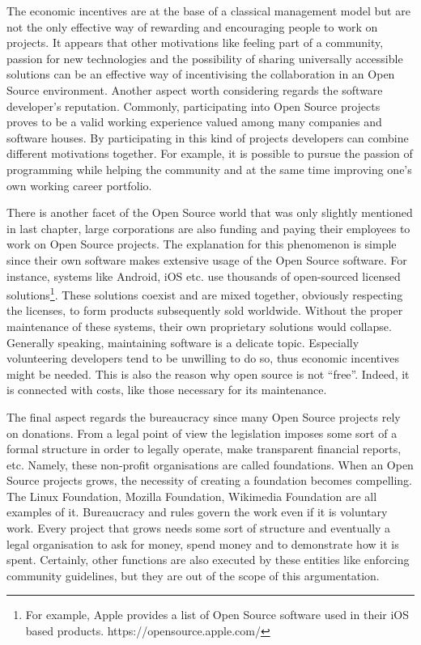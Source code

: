 The economic incentives are at the base of a classical management model but are not the only effective way of rewarding and encouraging people to work on projects. It appears that other motivations like feeling part of a community, passion for new technologies and the possibility of sharing universally accessible solutions can be an effective way of incentivising the collaboration in an Open Source environment.
Another aspect worth considering regards the software developer’s reputation. Commonly, participating into Open Source projects proves to be a valid working experience valued among many companies and software houses. By participating in this kind of projects developers can combine different motivations together. For example, it is possible to pursue the passion of programming while helping the community and at the same time improving one’s own working career portfolio.

There is another facet of the Open Source world that was only slightly mentioned in last chapter, large corporations are also funding and paying their employees to work on Open Source projects. The explanation for this phenomenon is simple since their own software makes extensive usage of the Open Source software. For instance, systems like Android, iOS etc. use thousands of open-sourced licensed solutions\footnote{For example, Apple provides a list of Open Source software used in their iOS based products. https://opensource.apple.com/}. These solutions coexist and are mixed together, obviously respecting the licenses, to form products subsequently sold worldwide.
Without the proper maintenance of these systems, their own proprietary solutions would collapse. Generally speaking, maintaining software is a delicate topic. Especially volunteering developers tend to be unwilling to do so, thus economic incentives might be needed. This is also the reason why open source is not “free”. Indeed, it is connected with costs, like those necessary for its maintenance.

The final aspect regards the bureaucracy since many Open Source projects rely on donations. From a legal point of view the legislation imposes some sort of a formal structure in order to legally operate, make transparent financial reports, etc. Namely, these non-profit organisations are called foundations. When an Open Source projects grows, the necessity of creating a foundation becomes compelling. The Linux Foundation, Mozilla Foundation, Wikimedia Foundation are all examples of it. Bureaucracy and rules govern the work even if it is voluntary work. Every project that grows needs some sort of structure and eventually a legal organisation to ask for money, spend money and to demonstrate how it is spent. Certainly, other functions are also executed by these entities like enforcing community guidelines, but they are out of the scope of this argumentation.

